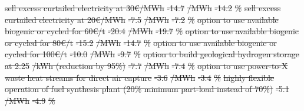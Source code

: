 \documentclass[5p,9pt,draft]{elsarticle}
\providecommand{\DIFdeltex}[1]{{\protect\color{red}\sout{#1}}}                      %
\providecommand{\DIFdelFL}[1]{\DIFdel{#1}} %
\providecommand{\DIFdel}[1]{\texorpdfstring{\DIFdeltex{#1}}{}} %
\begin{document}
\DIFdelFL{sell excess curtailed electricity at 30€/MWh }%
\DIFdelFL{-14.7 }%
\DIFdelFL{/MWh  }%
\DIFdelFL{-14.2 }%
\DIFdelFL{\% }%
\DIFdelFL{sell excess curtailed electricity at 20€/MWh }%
\DIFdelFL{-7.5 }%
\DIFdelFL{/MWh  }%
\DIFdelFL{-7.2 }%
\DIFdelFL{\% }%
        \DIFdelFL{option to use available biogenic or cycled \ce{CO2} for 60€/t }%
\DIFdelFL{-20.4 }%
\DIFdelFL{/MWh  }%
\DIFdelFL{-19.7 }%
\DIFdelFL{\% }%
\DIFdelFL{option to use available biogenic or cycled  for 80€/t }%
\DIFdelFL{-15.2 }%
\DIFdelFL{/MWh  }%
\DIFdelFL{-14.7 }%
\DIFdelFL{\% }%
\DIFdelFL{option to use available biogenic or cycled  for 100€/t }%
\DIFdelFL{-10.0 }%
\DIFdelFL{/MWh  }%
\DIFdelFL{-9.7 }%
\DIFdelFL{\% }%
\DIFdelFL{option to build geological hydrogen storage at 2.25 }%
\DIFdelFL{/kWh (reduction by 95\%) }%
\DIFdelFL{-7.7 }%
\DIFdelFL{/MWh  }%
\DIFdelFL{-7.4 }%
\DIFdelFL{\% }%
\DIFdelFL{option to use power-to-X waste heat streams for direct air capture }%
\DIFdelFL{-3.6 }%
\DIFdelFL{/MWh  }%
\DIFdelFL{-3.4 }%
\DIFdelFL{\% }%
\DIFdelFL{highly flexible operation of fuel synthesis plant (20\% minimum part-load instead of 70\%) }%
\DIFdelFL{-5.1 }%
\DIFdelFL{/MWh  }%
\DIFdelFL{-4.9 }%
\DIFdelFL{\% }%
\end{document}
